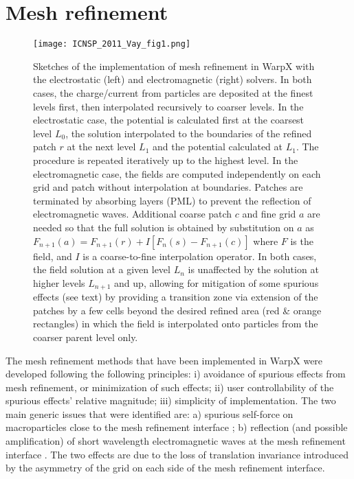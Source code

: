 

\section{Mesh refinement}

\begin{figure}[htb]
  \centering
  \texttt{[image: ICNSP\_2011\_Vay\_fig1.png]}
  \caption{Sketches of the implementation of mesh refinement in WarpX with the electrostatic (left) and electromagnetic (right) solvers. In both cases, the charge/current from particles are deposited at the finest levels first, then interpolated recursively to coarser levels. In the electrostatic case, the potential is calculated first at the coarsest level $L_0$, the solution interpolated to the boundaries of the refined patch $r$ at the next level $L_{1}$ and the potential calculated at $L_1$. The procedure is repeated iteratively up to the highest level.  In the electromagnetic case, the fields are computed independently on each grid and patch without interpolation at boundaries. Patches are terminated by absorbing layers (PML) to prevent the reflection of electromagnetic waves. Additional coarse patch $c$ and fine grid $a$ are needed so that the full solution is obtained by substitution on $a$ as $F_{n+1}(a)=F_{n+1}(r)+I[F_n( s )-F_{n+1}( c )]$ where $F$ is the field, and $I$ is a coarse-to-fine interpolation operator. In both cases, the field solution at a given level $L_n$ is unaffected by the solution at higher levels $L_{n+1}$ and up, allowing for mitigation of some spurious effects (see text) by providing a transition zone via extension of the patches by a few cells beyond the desired refined area (red \& orange rectangles) in which the field is interpolated onto particles from the coarser parent level only.}
  \label{fig:ESAMR}
\end{figure}

The mesh refinement methods that have been implemented in WarpX were developed following the following principles: i) avoidance of spurious effects from mesh refinement, or minimization of such effects; ii) user controllability of the spurious effects' relative magnitude; iii) simplicity of implementation. The two main generic issues that were identified are: a) spurious self-force on macroparticles close to the mesh refinement interface \cite{Vaylpb2002,Colellajcp2010}; b) reflection (and possible amplification) of short wavelength electromagnetic waves at the mesh refinement interface \cite{Vayjcp01}. The two effects are due to the loss of translation invariance introduced by the asymmetry of the grid on each side of the mesh refinement interface.

